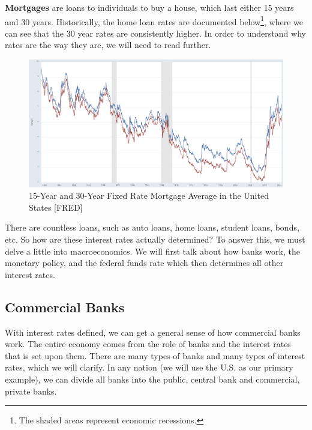 \documentclass{article}
\begin{document}
    \begin{example}
      \textbf{Mortgages} are loans to individuals to buy a house, which last either 15 years and 30 years. Historically, the home loan rates are documented below\footnote{The shaded areas represent economic recessions.}, where we can see that the 30 year rates are consistently higher. In order to understand why rates are the way they are, we will need to read further. 
      \begin{figure}[H]
        \centering 
        \includegraphics[scale=0.25]{img/mortgage.png}
        \caption{15-Year and 30-Year Fixed Rate Mortgage Average in the United States [FRED]} 
        \label{fig:mortgage}
      \end{figure}
    \end{example}

    There are countless loans, such as auto loans, home loans, student loans, bonds, etc. So how are these interest rates actually determined? To answer this, we must delve a little into macroeconomics. We will first talk about how banks work, the monetary policy, and the federal funds rate which then determines all other interest rates. 

  \subsection{Commercial Banks}

    With interest rates defined, we can get a general sense of how commercial banks work. The entire economy comes from the role of banks and the interest rates that is set upon them. There are many types of banks and many types of interest rates, which we will clarify. In any nation (we will use the U.S. as our primary example), we can divide all banks into the public, central bank and commercial, private banks. 
\end{document}
